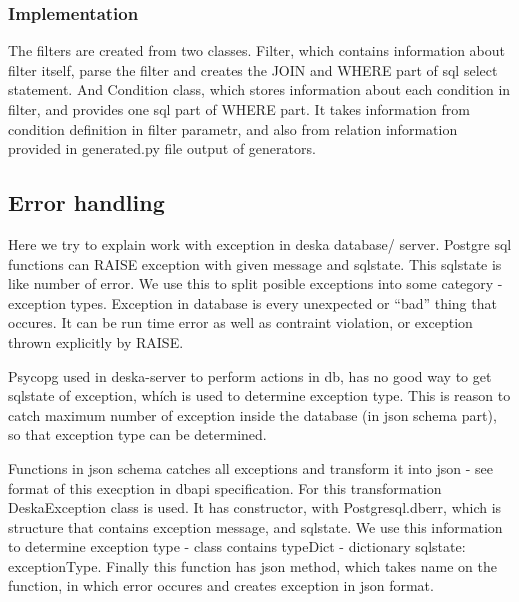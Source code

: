 \documentclass[deska]{subfiles}
\begin{document}
\subsubsection{Implementation}

The filters are created from two classes. Filter, which contains information about filter itself, parse the filter and creates
the JOIN and WHERE part of sql select statement. And Condition class, which stores information about each condition in filter, and provides
one sql part of WHERE part. It takes information from condition definition in filter parametr, and also from relation information provided
in generated.py file output of generators.

\subsection{Error handling}
Here we try to explain work with exception in deska database/ server. Postgre sql functions can RAISE exception with given message and sqlstate.
This sqlstate is like number of error. We use this to split posible exceptions into some category - exception types. Exception in database is
every unexpected or “bad” thing that occures. It can be run time error as well as contraint violation, or exception thrown explicitly by RAISE.

Psycopg used in deska-server to perform actions in db, has no good way to get sqlstate of exception, whích is used to determine exception type.
This is reason to catch maximum number of exception inside the database (in json schema part), so that exception type can be determined.

Functions in json schema catches all exceptions and transform it into json - see format of this execption in dbapi specification.
For this transformation DeskaException class is used. It has constructor, with Postgresql.dberr, which is structure that contains exception
message, and sqlstate. We use this information to determine exception type - class contains typeDict - dictionary {sqlstate: exceptionType}.
Finally this function has json method, which takes name on the function, in which error occures and creates exception in json format.
\end{document}
